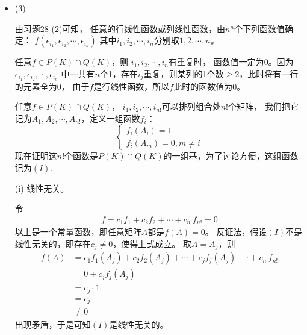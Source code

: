 \documentclass{article}
\begin{document}
\begin{itemize}
\begin{itemize}
          \item (ii) $P(K)$是$F(K)$的子空间。

                同理可知。
        \end{itemize}

  \item (3)

        由习题28-(2)可知，
        任意的行线性函数或列线性函数，由$n^n$个下列函数值确定：
        $f(\epsilon_{i_1}, \epsilon_{i_2}, \cdots, \epsilon_{i_n})$
        其中$i_1, i_2, \cdots, i_n$分别取$1, 2, \cdots, n$。

        任意$f \in P(K) \cap Q(K)$，则
        $i_1, i_2, \cdots, i_n$有重复时，
        函数值一定为$0$。因为$\epsilon_{i_1}, \epsilon_{i_2}, \cdots, \epsilon_{i_n}$
        中一共有$n$个1，存在$i_j$重复，则某列的1个数$\geq 2$，此时将有一行的元素全为0，
        由于$f$是行线性函数，所以$f$此时的函数值为0。

        任意$f \in P(K) \cap Q(K)$，
        $i_1, i_2, \cdots, i_{n!}$可以排列组合处$n!$个矩阵，
        我们把它记为$A_1, A_2, \cdots, A_{n!}$，定义一组函数$f_i$：
        \begin{equation*}
          \begin{cases}
            f_i(A_i) = 1 \\
            f_i(A_m) = 0, m \neq i
          \end{cases}
        \end{equation*}
        现在证明这$n!$个函数是$P(K) \cap Q(K)$的一组基，为了讨论方便，这组函数记为$(I)$.

        (i) 线性无关。

        令
        \begin{align*}
          f = c_1 f_1 + c_2 f_2 + \cdots + c_{n!} f_{n!} = 0
        \end{align*}
        以上是一个常量函数，即任意矩阵$A$都是$f(A) = 0$。
        反证法，假设$(I)$不是线性无关的，即存在$c_j \neq 0$，使得上式成立。
        取$A = A_j$，则
        \begin{align*}
          f(A) & = c_1 f_1(A_j) + c_2 f_2(A_j) + \cdots + c_j f_j(A_j) + \cdot + c_{n!} f_{n!} \\
               & = 0 + c_j f_j(A_j)                                                          \\
               & = c_j \cdot 1                                                               \\
               & = c_j                                                                       \\
               & \neq 0
        \end{align*}
        出现矛盾，于是可知$(I)$是线性无关的。


\end{itemize}
\end{document}
